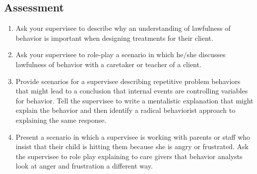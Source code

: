 \subsection{Assessment}
\begin{enumerate}
\item Ask your supervisee to describe why an understanding of lawfulness of behavior is important when designing treatments for their client.
\item Ask your supervisee to role-play a scenario in which he/she discusses lawfulness of behavior with a caretaker or teacher of a client.
%
\item Provide scenarios for a supervisee describing repetitive problem behaviors that might lead to a conclusion that internal events are controlling variables for behavior. Tell the supervisee to write a mentalistic explanation that might explain the behavior and then identify a radical behaviorist approach to explaining the same response.
\item Present a scenario in which a supervisee is working with parents or staff who insist that their child is hitting them because she is angry or frustrated. Ask the supervisee to role play explaining to care givers that behavior analysts look at anger and frustration a different way. 
%
\end{enumerate}
%
